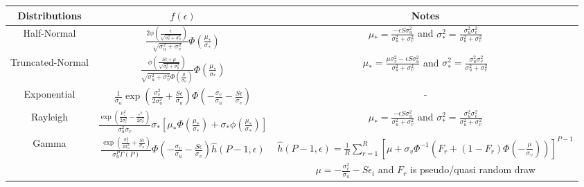 \documentclass[nojss]{jss}
\begin{document}
\begin{appendix}
\begin{table}[h]
 \renewcommand{\arraystretch}{1.3}
 \centering
\begin{adjustbox}{max width=1\textwidth}
 \begin{tabular}{@{}ccc@{}}
\toprule
Distributions & $f(\epsilon)$ & Notes \\
\midrule
Half-Normal & $\frac{2\phi{\left(\frac{\epsilon}{\sqrt{\sigma_v^2 + \sigma_u^2}}
\right)}}{\sqrt{\sigma_u^2 + \sigma_v^2}}\Phi\left(\frac{\mu_*}{\sigma_*}
\right)$ & $\mu_{*}= \frac{-\epsilon S\sigma_u^2}{\sigma_u^2 + \sigma_v^2}$ and 
$\sigma_*^2=\frac{\sigma_u^2\sigma_v^2}{\sigma_u^2 + \sigma_v^2}$\\
Truncated-Normal & $\frac{\phi{\left(\frac{S\epsilon + \mu}{\sqrt{
\sigma_v^2 + \sigma_u^2}}\right)}}{\sqrt{\sigma_u^2 + \sigma_v^2}\Phi
\left(\frac{\mu}{\sigma_u}\right)}\Phi\left(\frac{\mu_*}{\sigma_*}\right)$ & 
$\mu_*= \frac{\mu\sigma_v^2 - \epsilon S\sigma_u^2}{\sigma_u^2 + \sigma_v^2}$ 
and $\sigma_*^2=\frac{\sigma_u^2\sigma_v^2}{\sigma_u^2 + \sigma_v^2}$ \\
Exponential & $\frac{1}{\sigma_u}\exp{\left(\frac{\sigma_v^2}{2\sigma_u^2}+
\frac{S\epsilon}{\sigma_u}\right)}\Phi\left(-\frac{\sigma_v}{\sigma_u} - 
\frac{S\epsilon}{\sigma_v}\right)$ & -\\
Rayleigh & $\frac{\exp{\left(\frac{\mu_*^2}{2\sigma_*^2} - \frac{\epsilon^2}{
2\sigma_v^2} \right)}}{\sigma_u^2\sigma_v}\sigma_* \left[\mu_*\Phi\left(
\frac{\mu_*}{\sigma_*}\right) + \sigma_*\phi\left(\frac{\mu_*}{\sigma_*}
\right)\right]$ & $\mu_{*}= \frac{-\epsilon S\sigma_u^2}{\sigma_u^2 + \sigma_v^2}$ 
and $\sigma_*^2=\frac{\sigma_u^2\sigma_v^2}{\sigma_u^2 + \sigma_v^2}$\\
\multirow{2}{*}{Gamma} & \multirow{2}{*}{$\frac{\exp{\left(\frac{\sigma_v^2}{2\sigma_u^2} + \frac{S\epsilon}{
\sigma_u}\right)}}{\sigma_u^P\Gamma\left(P\right)}\Phi\left(-\frac{\sigma_v}{
\sigma_u} - \frac{S\epsilon}{\sigma_v}\right)\hat{h}(P-1, \epsilon)$} & 
$\hat{h}(P-1, \epsilon)= \frac{1}{R}\sum_{r = 1}^R \left[\mu + 
\sigma_v\Phi^{-1}\left(F_{r}+ \left(1-F_{r}\right)\Phi\left(-\frac{\mu}{
\sigma_v}\right)\right)\right]^{P-1}$\\
& &  $\mu = -\frac{\sigma_v^2}{\sigma_u} - S\epsilon_i$ and $F_{r}$ is pseudo/quasi random draw \\

\end{tabular}
\end{adjustbox}
\end{table}
\end{appendix}
\end{document}

